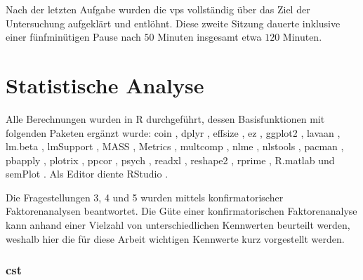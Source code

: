 \documentclass[11pt, twoside, a4paper]{book}		%
\begin{document}
\noindent Nach der letzten Aufgabe wurden die \glspl{vp} vollständig über das Ziel der Untersuchung aufgeklärt und entlöhnt. Diese zweite Sitzung dauerte inklusive einer fünfminütigen Pause nach $50$ Minuten insgesamt etwa $120$ Minuten.

\section{Statistische Analyse \label{sec:StatistischeAnalyse}}

Alle Berechnungen wurden in R \citep{R} durchgeführt, dessen Basisfunktionen mit folgenden Paketen ergänzt wurde:
{coin} \citep{coin},
dplyr \citep{dplyr},
effsize \citep{effsize},
ez \citep{ez},
ggplot2 \citep{ggplot2},
lavaan \citep{lavaan},
lm.beta \citep{lm.beta},
lmSupport \citep{lmSupport},
MASS \citep{MASS},
Metrics \citep{Metrics},		%
multcomp \citep{multcomp},
nlme \citep{nlme},
nlstools \citep{nlstools},
pacman \citep{pacman},
pbapply \citep{pbapply},
plotrix \citep{plotrix},
ppcor \citep{ppcor},
psych \citep{psych},
readxl \citep{readxl},
reshape2 \citep{reshape2},
rprime \citep{rprime},
R.matlab \citep{R.matlab} und
semPlot \citep{semPlot}.
Als Editor diente RStudio \citep{RStudio}.

Die Fragestellungen 3, 4 und 5 wurden mittels konfirmatorischer Faktorenanalysen beantwortet. Die Güte einer konfirmatorischen Faktorenanalyse kann anhand einer Vielzahl von unterschiedlichen Kennwerten beurteilt werden, weshalb hier die für diese Arbeit wichtigen Kennwerte kurz vorgestellt werden.

\subsubsection*{\gls{cst}}
\end{document}
